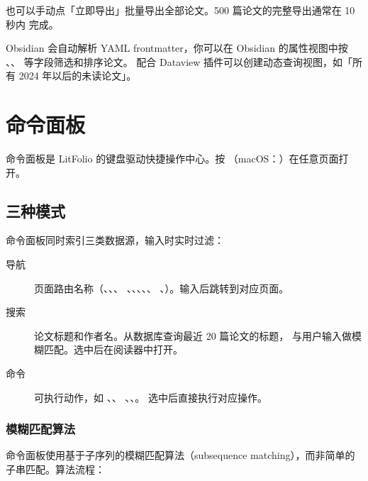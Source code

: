 也可以手动点「立即导出」批量导出全部论文。500 篇论文的完整导出通常在 10 秒内
完成。

\begin{tipbox}
Obsidian 会自动解析 YAML frontmatter，你可以在 Obsidian 的属性视图中按
、、 等字段筛选和排序论文。
配合 Dataview 插件可以创建动态查询视图，如「所有 2024 年以后的未读论文」。
\end{tipbox}

\chapter{命令面板}
\label{ch:palette}

命令面板是 LitFolio 的键盘驱动快捷操作中心。按 
（macOS：）在任意页面打开。


\section{三种模式}

命令面板同时索引三类数据源，输入时实时过滤：

\begin{description}
  \item[导航] 页面路由名称（、、、
    、、、、、
    、）。输入后跳转到对应页面。
  \item[搜索] 论文标题和作者名。从数据库查询最近 20 篇论文的标题，
    与用户输入做模糊匹配。选中后在阅读器中打开。
  \item[命令] 可执行动作，如 、、
    、、。
    选中后直接执行对应操作。
\end{description}

\subsection{模糊匹配算法}

命令面板使用基于子序列的模糊匹配算法（subsequence matching），而非简单的
子串匹配。算法流程：

